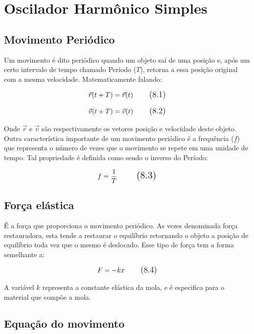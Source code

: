 \section{Oscilador Harmônico Simples}

\subsection{Movimento Periódico}

Um movimento é dito periódico quando um objeto saí de uma posição e, após um certo intervalo de tempo chamado Período ($T$), retorna a essa posição original com a mesma velocidade. Matematicamente falando:

\begin{equation}
\large \vec{r}(t + T) = \vec{r}(t)
\tag{8.1}
\end{equation}

\begin{equation}
\large \vec{v}(t + T) = \vec{v}(t)
\tag{8.2}
\end{equation}

Onde $\vec{r}$ e $\vec{v}$ são respectivamente os vetores posição e velocidade deste objeto.  
Outra característica importante de um movimento periódico é a frequência ($f$) que representa o número de vezes que o movimento se repete em uma unidade de tempo. Tal propriedade é definida como sendo o inverso do Período:

\begin{equation}
\Large f = \frac{1}{T}
\tag{8.3}
\end{equation}


\subsection{Força elástica}

É a força que proporciona o movimento periódico. As vezes denominada força restauradora, esta tende a restaurar o equilíbrio retornando o objeto a posição de equilíbrio toda vez que o mesmo é deslocado. Esse tipo de força tem a forma semelhante a:

\begin{equation}
\large F = -kx
\tag{8.4}
\end{equation}

A variável $k$ representa a constante elástica da mola, e é especifica para o material que compõe a mola.

\subsection{Equação do movimento}

